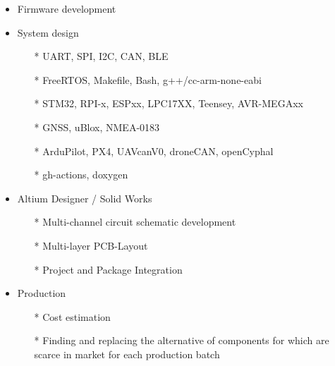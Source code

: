         {
        \begin{itemize}
            \item Firmware development
            \item System design
            \begin{itemize}
                \item[*] UART, SPI, I2C, CAN, BLE
                \item[*] FreeRTOS,  Makefile, Bash, g++/cc-arm-none-eabi
                \item[*] STM32, RPI-x, ESPxx, LPC17XX, Teensey, AVR-MEGAxx 
                \item[*] GNSS, uBlox, NMEA-0183
                \item[*] ArduPilot, PX4, UAVcanV0, droneCAN, openCyphal
                \item[*] gh-actions, doxygen
            \end{itemize}
            \item Altium Designer / Solid Works \begin{itemize}
                \item[*] Multi-channel circuit schematic development
                \item[*] Multi-layer PCB-Layout
                \item[*] Project and Package Integration
            \end{itemize}
            \item Production 
            \begin{itemize}
            \item[*] Cost estimation 
            \item[*] Finding and replacing the alternative of components for which are scarce in market for each production batch
            \end{itemize} 
        \end{itemize}
        }

